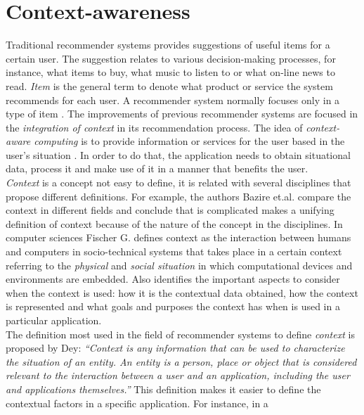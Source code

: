 \section{Context-awareness} \label{context-awareness}

Traditional recommender systems provides suggestions of useful items
for a certain user. The suggestion relates to various decision-making
processes, for instance, what items to buy, what music to listen to or
what on-line news to read. \textit{Item} is the general term to denote
what product or service the system recommends for each user. A
recommender system normally focuses only in a type of item
\cite{resnick1997recommender}.
The improvements of previous recommender systems are focused in the
\textit{integration of context} in its recommendation process. 
The idea of \textit{context-aware computing} is to provide
information or services for the user based in the user's situation
\cite{dey2001understanding}. In order to do that, the application 
needs to obtain situational data, process it and make use of it 
in a manner that benefits the user. \\ 
\textit{Context} is a concept not easy to define, it is related with
several disciplines that propose different definitions. For example,
the authors Bazire et.al.\cite{bazire2005understanding} compare the
context in different fields and conclude that is complicated makes a
unifying definition of context because of the nature of the concept in
the disciplines. In computer sciences Fischer
G.\cite{fischer2012context} defines context as the interaction between
humans and computers in socio-technical systems that takes place in a
certain context referring to the \textit{physical} and \textit{social
situation} in which computational devices and environments are
embedded. Also identifies the important aspects to consider when the
context is used: how it is the contextual data
obtained, how the context is represented and what goals and purposes
the context has when is used in a particular application. \\
The definition most used in the field of recommender systems to
define \textit{context} is proposed by Dey\cite{dey2001understanding}:
\textit{``Context is any information that can be used to characterize
the situation of an entity. An entity is a person, place or object
that is considered relevant to the interaction between a user and  an
application, including the user and applications themselves.''}  This
definition makes it easier to define the contextual factors in a
specific application. For instance, in a

